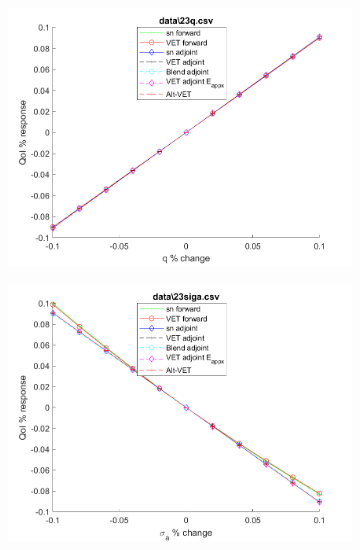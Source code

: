 \documentclass[12pt]{report}
\begin{document}
\begin{figure}[H]
\label{Trial2}
\centering
\begin{subfigure}{.5\textwidth}
  \centering
  \includegraphics[width=.98\linewidth]{figures2/23qSens.png}
  \label{T2:sfig1}
\end{subfigure}%
\begin{subfigure}{.5\textwidth}
  \centering
  \includegraphics[width=.98\linewidth]{figures2/23sigaSens.png}
  \label{T2:sfig2}
\end{subfigure}
%
\begin{subfigure}{.5\textwidth}
  \centering

\end{subfigure}
\end{figure}
\end{document}
